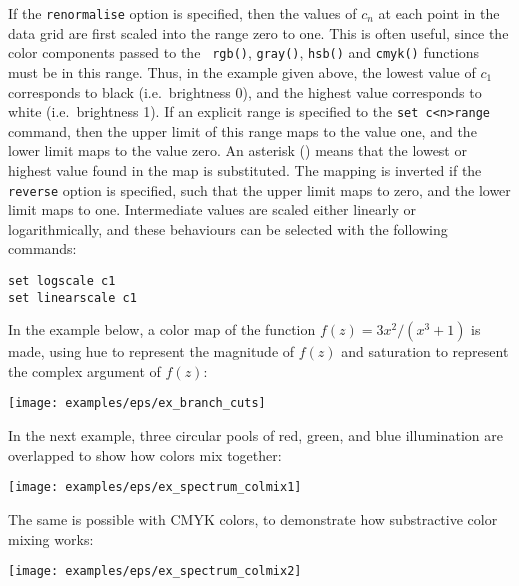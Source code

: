 \noindent If the {\tt renor\-malise} option is specified, then the values of
$c_n$ at each point in the data grid are first scaled into the range zero to
one. This is often useful, since the color components passed to the {\tt
rgb()}, {\tt gray()}, {\tt hsb()} and {\tt cmyk()} functions must be in this
range.  Thus, in the example given above, the lowest value of $c_1$ corresponds
to black (i.e.\ brightness 0), and the highest value corresponds to white
(i.e.\ brightness 1). If an explicit range is specified to the {\tt set
c<n>range} command, then the upper limit of this range maps to the value one,
and the lower limit maps to the value zero. An asterisk ({\tt *}) means that
the lowest or highest value found in the map is substituted. The mapping is
inverted if the {\tt reverse} option is specified, such that the upper limit
maps to zero, and the lower limit maps to one.  Intermediate values are scaled
either linearly or logarithmically, and these behaviours can be selected with
the following commands:
\begin{verbatim}
set logscale c1
set linearscale c1
\end{verbatim}

In the example below, a color map of the function $f(z)=3x^2/(x^3+1)$ is made,
using hue to represent the magnitude of $f(z)$ and saturation to represent the
complex argument of $f(z)$:

\vspace{2mm}

\vspace{2mm}

\centerline{\texttt{[image: examples/eps/ex\_branch\_cuts]}}

In the next example, three circular pools of red, green, and blue illumination are overlapped to show how colors mix together:

\vspace{2mm}

\vspace{2mm}

\centerline{\texttt{[image: examples/eps/ex\_spectrum\_colmix1]}}

The same is possible with CMYK colors, to demonstrate how substractive color mixing works:

\vspace{2mm}

\vspace{2mm}

\centerline{\texttt{[image: examples/eps/ex\_spectrum\_colmix2]}}

